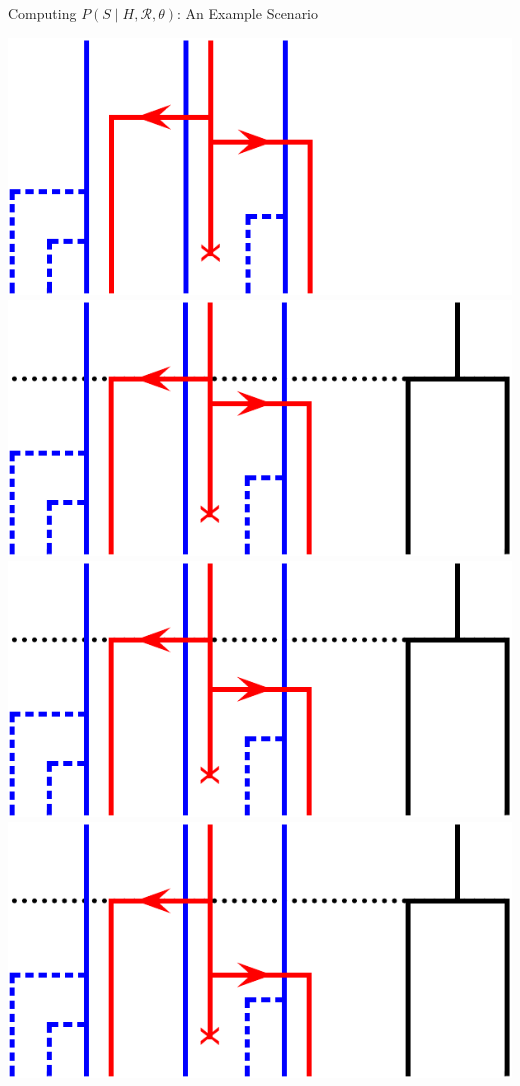\documentclass{beamer}
\newcommand{\R}{\ensuremath{\mathcal{R}}}
\begin{document}
\begin{frame}{Computing $P\left(S\mid H,\R,\theta\right)$: An Example Scenario}

\centering

\begin{overprint}
\centering\includegraphics{figures/example_case/1.pdf}
\centering\includegraphics{figures/example_case/2.pdf}
\centering\includegraphics{figures/example_case/3.pdf}
\centering\includegraphics{figures/example_case/4.pdf}

\end{overprint}
\end{frame}
\end{document}
